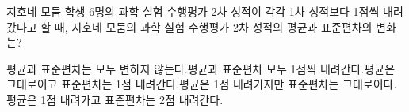 지호네 모둠 학생 6명의 과학 실험 수행평가 2차 성적이 각각 1차 성적보다 1점씩 내려갔다고 할 때, 지호네 모둠의 과학 실험 수행평가 2차 성적의 평균과 표준편차의 변화는?
\begin{choicesv}{평균과 표준편차는 모두 변하지 않는다.}{평균과 표준편차 모두 1점씩 내려간다.}{평균은 그대로이고 표준편차는 1점 내려간다.}{평균은 1점 내려가지만 표준편차는 그대로이다.}{평균은 1점 내려가고 표준편차는 2점 내려간다.}\end{choicesv}
